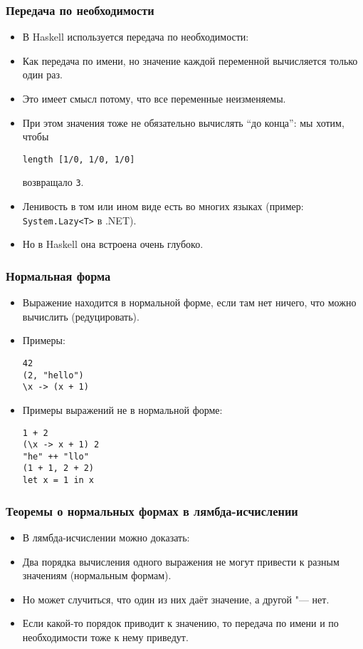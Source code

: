 \documentclass[11pt]{beamer}
\begin{document}
\begin{frame}[fragile]
\frametitle{Передача по необходимости}
\begin{itemize}
    \item В Haskell используется передача по необходимости:
    \item Как передача по имени, но значение каждой переменной вычисляется только один раз.
    \pause
    \item Это имеет смысл потому, что все переменные неизменяемы.
    \pause
    \item При этом значения тоже не обязательно вычислять \enquote{до конца}: мы хотим, чтобы 
\begin{lstlisting}
length [1/0, 1/0, 1/0]
\end{lstlisting}
    возвращало \lstinline|3|.
    \pause
    \item Ленивость в том или ином виде есть во многих языках (пример: \lstinline|System.Lazy<T>| в .NET).
    \item Но в Haskell она встроена очень глубоко.
\end{itemize}
\end{frame}

\begin{frame}[fragile]
\frametitle{Нормальная форма}
\begin{itemize}
\item Выражение находится в нормальной форме, если там нет ничего, что можно вычислить (редуцировать).
\item Примеры: \pause
\begin{lstlisting}
42
(2, "hello")
\x -> (x + 1)
\end{lstlisting}
\item Примеры выражений не в нормальной форме: \pause
\begin{lstlisting}
1 + 2                 
(\x -> x + 1) 2       
"he" ++ "llo"         
(1 + 1, 2 + 2)
let x = 1 in x
\end{lstlisting}
\end{itemize}
\end{frame}

\begin{frame}[fragile]
\frametitle{Теоремы о нормальных формах в лямбда-исчислении}
\begin{itemize}
    \item В лямбда-исчислении можно доказать:
    \item Два порядка вычисления одного выражения не могут привести к разным значениям (нормальным формам).
    \item Но может случиться, что один из них даёт значение, а другой "--- нет.
    \item Если какой-то порядок приводит к значению, то передача по имени и по необходимости тоже к нему приведут.
\end{itemize}
\end{frame}
\end{document}
